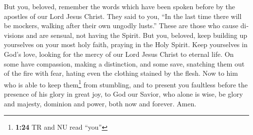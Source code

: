 \begin{paracol}{2}
\begin{otherlanguage}{english}
 But you, beloved, remember the words which have been
spoken before by the apostles of our Lord Jesus Christ. 
They said to you, ``In the last time there will be mockers, walking
after their own ungodly lusts.''  These are those who
cause divisions and are sensual, not having the Spirit. 
But you, beloved, keep building up yourselves on your most holy faith,
praying in the Holy Spirit.  Keep yourselves in God's
love, looking for the mercy of our Lord Jesus Christ to eternal life.
 On some have compassion, making a distinction,
 and some save, snatching them out of the fire with fear,
hating even the clothing stained by the flesh.  Now to
him who is able to keep them\footnote{\textbf{1:24} TR and NU read
  ``you''} from stumbling, and to present you faultless before the
presence of his glory in great joy,  to God our Savior,
who alone is wise, be glory and majesty, dominion and power, both now
and forever. Amen. \end{otherlanguage}
\end{paracol}
